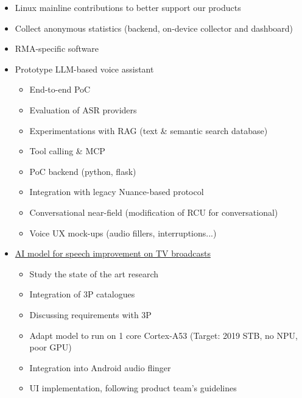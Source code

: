 \documentclass[12pt,a4paper,sans]{moderncv}        %
\begin{document}
{\begin{itemize}
        \item Linux mainline contributions to better support our products
        \item Collect anonymous statistics (backend, on-device collector and dashboard)
        \item RMA-specific software
        \item Prototype LLM-based voice assistant
            \begin{itemize}
                \item End-to-end PoC
                \item Evaluation of ASR providers
                \item Experimentations with RAG (text \& semantic search database)
                \item Tool calling \& MCP
                \item PoC backend (python, flask)
                \item Integration with legacy Nuance-based protocol
                \item Conversational near-field (modification of RCU for conversational)
                \item Voice UX mock-ups (audio fillers, interruptions...)
            \end{itemize}
        \item \href{https://github.com/phhusson/speechseparation}{AI model for speech improvement on TV broadcasts}
            \begin{itemize}
                \item Study the state of the art research
                \item Integration of 3P catalogues
                \item Discussing requirements with 3P
                \item Adapt model to run on 1 core Cortex-A53 (Target: 2019 STB, no NPU, poor GPU)
                \item Integration into Android audio flinger
                \item UI implementation, following product team's guidelines
            \end{itemize}
	\end{itemize}
}
\end{document}
